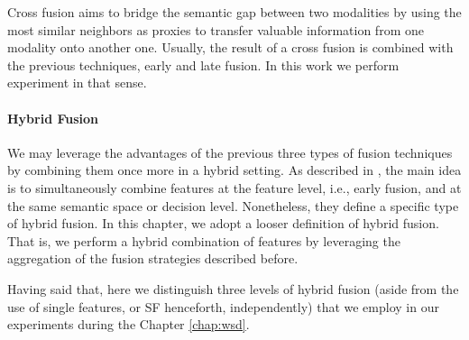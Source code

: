 Cross fusion aims to bridge the semantic gap between two modalities by using the most similar neighbors as proxies to transfer valuable information  from one modality onto another one. Usually, the result of a cross fusion is combined with the previous techniques, early and late fusion. In this work we perform  experiment in that sense.

\paragraph{Hybrid Fusion}
We may leverage the advantages of the previous three types of fusion techniques by combining them once more in a hybrid setting. As described in \cite{AtreyHEK10,yu2014informedia}, the main idea is to simultaneously combine features at the feature level, i.e., early fusion, and at the same semantic space or decision level. Nonetheless, they define a specific type of hybrid fusion. In this chapter, we adopt a looser definition of hybrid fusion. That is, we perform a hybrid combination of features by leveraging the aggregation of the fusion strategies described before. 

Having said that, here we distinguish three levels of hybrid fusion (aside from the use of single features, or SF henceforth, independently) that we employ in our experiments during the Chapter \ref{chap:wsd}. 

